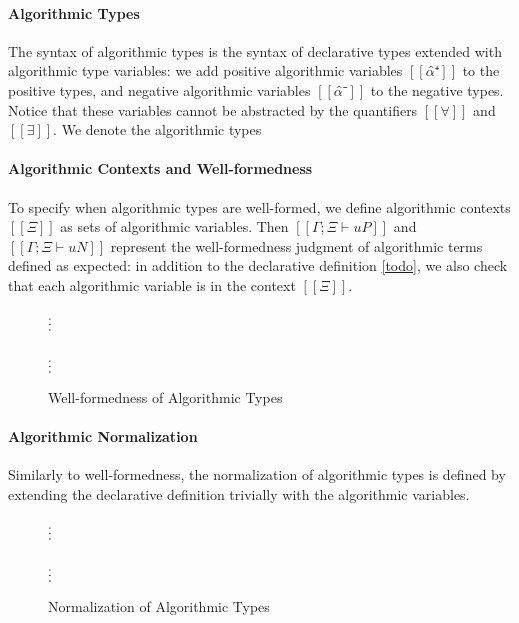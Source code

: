 \paragraph{Algorithmic Types}
The syntax of  algorithmic types is the syntax of declarative types extended
with algorithmic type variables: we add positive algorithmic variables $[[α̂⁺]]$ 
to the positive types, and negative algorithmic variables $[[α̂⁻]]$ to the negative types.
Notice that these variables cannot be abstracted by the quantifiers $[[∀]]$ and $[[∃]]$.
We denote the algorithmic types 

\paragraph{Algorithmic Contexts and Well-formedness}
To specify when algorithmic types are well-formed, 
we define algorithmic contexts $[[Ξ]]$ as sets of algorithmic variables.
Then $[[Γ ; Ξ ⊢ uP]]$ and $[[Γ ; Ξ ⊢ uN]]$ represent the well-formedness
judgment of algorithmic terms defined as expected: in addition to the declarative definition
\cref{todo}, we also check that each algorithmic variable is in the context $[[Ξ]]$.
\begin{figure}[h]
\begin{multicols}{2}
  $\vcenter{\hbox{\vdots}}$\\
  \ottusedrule{\ottdruleWFATPUVar{}}
  \columnbreak\\
  $\vcenter{\hbox{\vdots}}$\\
  \ottusedrule{\ottdruleWFATNUVar{}}
\end{multicols}
\label{fig:algo-wf}
\caption{Well-formedness of Algorithmic Types}
\end{figure}

\paragraph{Algorithmic Normalization}
Similarly to well-formedness, the normalization of algorithmic types is defined
by extending the declarative definition trivially with the algorithmic variables.

\begin{figure}[h]
\begin{multicols}{2}
  $\vcenter{\hbox{\vdots}}$\\
  \ottusedrule{\ottdruleNrmPUVar{}}
  \columnbreak\\
  $\vcenter{\hbox{\vdots}}$\\
  \ottusedrule{\ottdruleNrmNUVar{}}
\end{multicols}
\label{fig:algo-nf}
\caption{Normalization of Algorithmic Types}
\end{figure}

